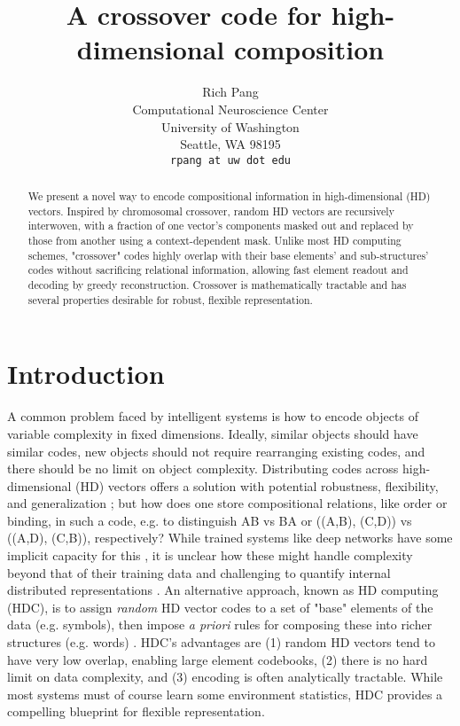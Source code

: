 \documentclass{article}
\title{A crossover code for high-dimensional composition}
\author{%
  Rich Pang\\
  Computational Neuroscience Center\\
  University of Washington\\
  Seattle, WA 98195\\
  \texttt{rpang at uw dot edu} \\
}
\begin{document}
\maketitle

\begin{abstract}
We present a novel way to encode compositional information in high-dimensional (HD) vectors. Inspired by chromosomal crossover, random HD vectors are recursively interwoven, with a fraction of one vector's components masked out and replaced by those from another using a context-dependent mask. Unlike most HD computing schemes, "crossover" codes highly overlap with their base elements' and sub-structures' codes without sacrificing relational information, allowing fast element readout and decoding by greedy reconstruction. Crossover is mathematically tractable and has several properties desirable for robust, flexible representation.
\end{abstract}

\section{Introduction}

A common problem faced by intelligent systems is how to encode objects of variable complexity in fixed dimensions. Ideally, similar objects should have similar codes, new objects should not require rearranging existing codes, and there should be no limit on object complexity. Distributing codes across high-dimensional (HD) vectors offers a solution with potential robustness, flexibility, and generalization \cite{Hinton:1984, Mikolov:2013}; but how does one store compositional relations, like order or binding, in such a code, e.g. to distinguish AB vs BA or ((A,B), (C,D)) vs ((A,D), (C,B)), respectively? While trained systems like deep networks have some implicit capacity for this \cite{Bahdanau:2014, Luong:2015, Wu:2016}, it is unclear how these might handle complexity beyond that of their training data and challenging to quantify internal distributed representations \cite{Lipton:2016}. An alternative approach, known as HD computing (HDC), is to assign \textit{random} HD vector codes to a set of "base" elements of the data (e.g. symbols), then impose \textit{a priori} rules for composing these into richer structures (e.g. words) \cite{Plate:1995, Kanerva:2009, Gayler:2004}. HDC's advantages are (1) random HD vectors tend to have very low overlap, enabling large element codebooks, (2) there is no hard limit on data complexity, and (3) encoding is often analytically tractable. While most systems must of course learn some environment statistics, HDC provides a compelling blueprint for flexible representation.
\end{document}
